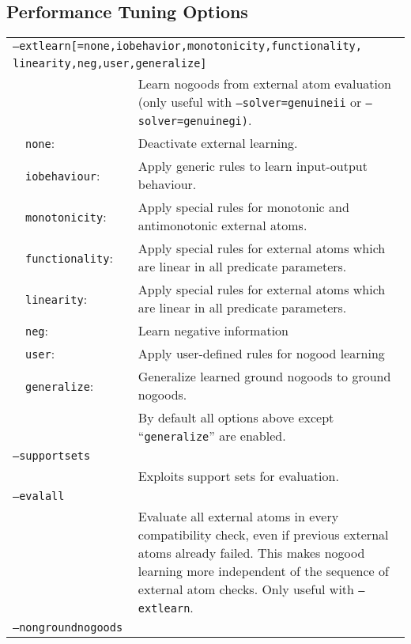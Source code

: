 \documentclass[a4paper, titlepage]{article}
\begin{document}
\subsection{Performance Tuning Options}
\begin{center}
\begin{longtable}{p{0.7cm}  p{2.2cm} p{0.3cm} p{6.3cm}  } 
\multicolumn{4}{p{6cm}}{\texttt{--extlearn[=none,iobehavior,monotonicity,functionality,}} \\[-1.5ex]
\multicolumn{4}{p{6cm}}{\texttt{\hphantom{--extlearn[}linearity,neg,user,generalize]}} \\

& & & Learn nogoods from external atom evaluation (only useful with \texttt{--solver=genuineii} or \texttt{--solver=genuinegi)}.\\
&\texttt{none}:& & Deactivate external learning. \\
&\texttt{iobehaviour}:& &Apply generic rules to learn input-output behaviour. \\
&\texttt{monotonicity}:& &Apply special rules for monotonic and antimonotonic external atoms.\\
&\texttt{functionality}:& &Apply special rules for external atoms which are linear in all predicate parameters.\\
&\texttt{linearity}:& &Apply special rules for external atoms which are linear in all predicate parameters.\\
&\texttt{neg}:& &Learn negative information\\
&\texttt{user}:& &Apply user-defined rules for nogood learning\\
&\texttt{generalize}:& &Generalize learned ground nogoods to ground nogoods.\\
& & & By default all options above except ``\texttt{generalize}'' are enabled.\\
\multicolumn{4}{l}{\texttt{--supportsets}}\\
& & &Exploits support sets for evaluation.\\
\multicolumn{4}{l}{\texttt{--evalall}}\\
& & &Evaluate all external atoms in every compatibility check, even if previous external atoms already failed.  This makes nogood learning more independent of the sequence of external atom checks. Only useful with \texttt{--extlearn}.\\
\multicolumn{4}{l}{\texttt{--nongroundnogoods}}\\

\end{longtable}
\end{center}
\end{document}
